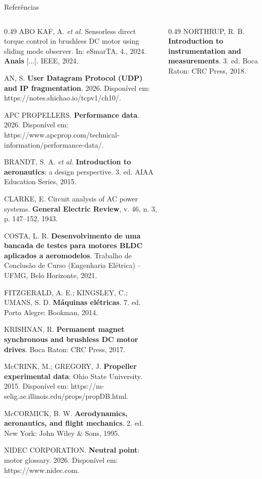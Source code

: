 \begin{frame}{Referências}
  \tiny
  \setlength{\parskip}{0.3em}
  \begin{columns}[t]
    \begin{column}{0.49\textwidth}\setlength{\parskip}{0.35em}
      ABO KAF, A. \textit{et al.} Sensorless direct torque control in
      brushless DC motor using sliding mode observer. In: eSmarTA, 4., 2024.
      \textbf{Anais} [...]. IEEE, 2024.

      AN, S. \textbf{User Datagram Protocol (UDP) and IP fragmentation}.
      2026. Disponível em: https://notes.shichao.io/tcpv1/ch10/.

      APC PROPELLERS. \textbf{Performance data}. 2026. Disponível em:
      https://www.apcprop.com/technical-information/performance-data/.

      BRANDT, S. A. \textit{et al.} \textbf{Introduction to aeronautics}:
      a design perspective. 3. ed. AIAA Education Series, 2015.

      CLARKE, E. Circuit analysis of AC power systems. \textbf{General
      Electric Review}, v. 46, n. 3, p. 147--152, 1943.

      COSTA, L. R. \textbf{Desenvolvimento de uma bancada de testes para
      motores BLDC aplicados a aeromodelos}. Trabalho de Conclusão de Curso
      (Engenharia Elétrica) -- UFMG, Belo Horizonte, 2021.

      FITZGERALD, A. E.; KINGSLEY, C.; UMANS, S. D. \textbf{Máquinas
      elétricas}. 7. ed. Porto Alegre: Bookman, 2014.

      KRISHNAN, R. \textbf{Permanent magnet synchronous and brushless DC
      motor drives}. Boca Raton: CRC Press, 2017.

      McCRINK, M.; GREGORY, J. \textbf{Propeller experimental data}: Ohio
      State University. 2015. Disponível em:
      https://m-selig.ae.illinois.edu/props/propDB.html.

      McCORMICK, B. W. \textbf{Aerodynamics, aeronautics, and flight
      mechanics}. 2. ed. New York: John Wiley \& Sons, 1995.

      NIDEC CORPORATION. \textbf{Neutral point}: motor glossary. 2026.
      Disponível em: https://www.nidec.com.
    \end{column}
    \begin{column}{0.49\textwidth}\setlength{\parskip}{0.35em}
      NORTHRUP, R. B. \textbf{Introduction to instrumentation and
      measurements}. 3. ed. Boca Raton: CRC Press, 2018.


\end{column}
\end{columns}
\end{frame}
